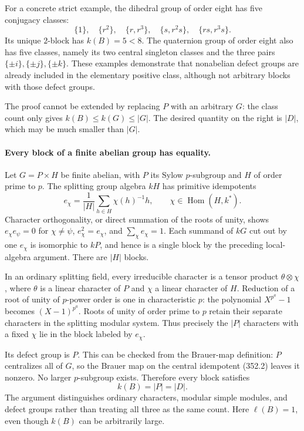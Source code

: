 \documentclass[11pt]{article}
\begin{document}
For a concrete strict example, the dihedral group of order eight has
five conjugacy classes:
\[
 \{1\},\quad\{r^2\},\quad\{r,r^3\},\quad
 \{s,r^2s\},\quad\{rs,r^3s\}.
\]
Its unique $2$-block has $k(B)=5<8$. The quaternion group of order
eight also has five classes, namely its two central singleton classes
and the three pairs $\{\pm i\},\{\pm j\},\{\pm k\}$.
These examples demonstrate that nonabelian defect groups are already
included in the elementary positive class, although not arbitrary
blocks with those defect groups.

The proof cannot be extended by replacing $P$ with an arbitrary $G$:
the class count only gives $k(B)\le k(G)\le|G|$. The desired quantity
on the right is $|D|$, which may be much smaller than $|G|$.

\paragraph{Every block of a finite abelian group has equality.}
Let $G=P\times H$ be finite abelian, with $P$ its Sylow $p$-subgroup
and $H$ of order prime to $p$. The splitting group algebra $kH$ has
primitive idempotents
\[
 e_\chi=\frac1{|H|}\sum_{h\in H}\chi(h)^{-1}h,
 \qquad \chi\in\operatorname{Hom}(H,k^*).
 \tag{352.2}
\]
Character orthogonality, or direct summation of the roots of unity,
shows $e_\chi e_\psi=0$ for $\chi\ne\psi$, $e_\chi^2=e_\chi$,
and $\sum_\chi e_\chi=1$. Each summand of $kG$ cut out by one
$e_\chi$ is isomorphic to $kP$, and hence is a single block by the
preceding local-algebra argument. There are $|H|$ blocks.

In an ordinary splitting field, every irreducible character is a tensor
product $\theta\otimes\chi$, where $\theta$ is a linear character
of $P$ and $\chi$ a linear character of $H$. Reduction of a root of
unity of $p$-power order is one in characteristic $p$: the polynomial
$X^{p^a}-1$ becomes $(X-1)^{p^a}$. Roots of unity of order prime to
$p$ retain their separate characters in the splitting modular system.
Thus precisely the $|P|$ characters with a fixed $\chi$ lie in the
block labeled by $e_\chi$.

Its defect group is $P$. This can be checked from the Brauer-map
definition: $P$ centralizes all of $G$, so the Brauer map on the
central idempotent (352.2) leaves it nonzero. No larger $p$-subgroup
exists. Therefore every block satisfies
\[
 k(B)=|P|=|D|.
 \tag{352.3}
\]
The argument distinguishes ordinary characters, modular simple modules,
and defect groups rather than treating all three as the same count.
Here $\ell(B)=1$, even though $k(B)$ can be arbitrarily large.
\end{document}
